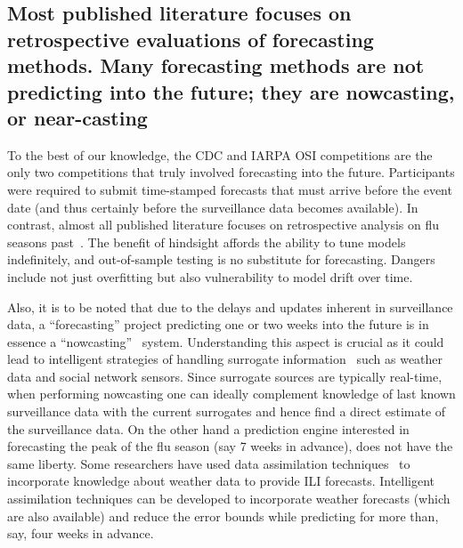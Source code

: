\documentclass[10pt,letterpaper]{article}
\begin{document}
\subsection*{Most published literature focuses on retrospective evaluations of 
forecasting methods. Many forecasting methods are not predicting into the future;
they are nowcasting, or near-casting}
To the best of our knowledge, the CDC and IARPA OSI competitions are the only
two competitions that truly involved forecasting into the future. Participants
were required to submit time-stamped forecasts that must arrive before the
event date (and thus certainly before the surveillance data becomes available).
In contrast, almost all published literature focuses on retrospective analysis
on flu seasons past~\cite{hall2007}.
The benefit of hindsight affords the ability to tune
models indefinitely, and out-of-sample testing is no substitute for
forecasting. Dangers include not just overfitting but also vulnerability to
model drift over time.

Also, it is to be noted that due to the delays and updates inherent in surveillance data, a ``forecasting''
project predicting one or two weeks into the future is in essence a
``nowcasting''~\cite{lampos2012nowcasting} system.  Understanding this aspect
is crucial as it could lead to intelligent strategies of handling surrogate
information~\cite{Preis140095} such as weather data and social network sensors.
Since surrogate sources are typically real-time, when performing nowcasting one
can ideally complement knowledge of last known surveillance data with the
current surrogates and hence find a direct estimate of the surveillance data.
On the other hand a prediction engine interested in forecasting the peak of the
flu season (say 7 weeks in advance), does not have the same liberty. Some
researchers have used data assimilation
techniques~\cite{lampos2012nowcasting,ronni2015empbayes} to incorporate
knowledge about weather data to provide ILI forecasts. Intelligent assimilation
techniques can be developed to incorporate weather forecasts (which are also
available) and reduce the error bounds while predicting for more than, say,
four weeks in advance. 
\end{document}
